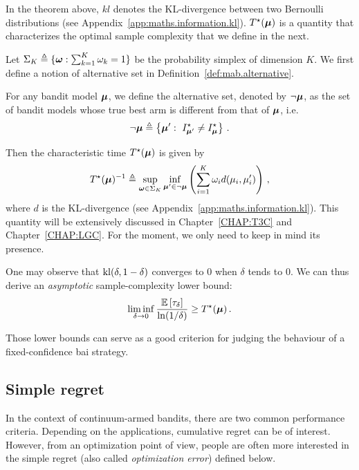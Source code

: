 In the theorem above, $kl$ denotes the KL-divergence between two Bernoulli distributions (see Appendix~\ref{app:maths.information.kl}). $T^\star({\boldsymbol \mu})$ is a quantity that characterizes the optimal sample complexity that we define in the next.

Let $\Sigma_K \triangleq \{{\boldsymbol \omega} : \sum_{k=1}^K \omega_k = 1\}$ be the probability simplex of dimension $K$. We first define a notion of \gls{alternative set} in Definition~\ref{def:mab.alternative}.

\begin{definition}\label{def:mab.alternative}
\begin{leftbar}[defnbar]
For any bandit model ${\boldsymbol \mu}$, we define the alternative set, denoted by $\neg {\boldsymbol \mu}$, as the set of bandit models whose true best arm is different from that of ${\boldsymbol \mu}$, i.e.
\[
    \neg \bmu \eqdef \left\{\bmu':\ \Istar_{\bmu'}\neq\Istar_\bmu\right\}\,.
\]
\end{leftbar}
\end{definition}

Then the characteristic time $T^\star({\boldsymbol \mu})$ is given by
\begin{align}\label{eq:mab.characteristic}
    T^\star({\boldsymbol \mu})^{-1} \triangleq \sup_{{\boldsymbol \omega}\in\Sigma_K}\inf_{{\boldsymbol \mu}'\in\neg{\boldsymbol \mu}}\left(\sum_{i=1}^K \omega_i d(\mu_i,\mu'_i)\right)\,,
\end{align}
where $d$ is the KL-divergence (see Appendix~\ref{app:maths.information.kl}). This quantity will be extensively discussed in Chapter~\ref{CHAP:T3C} and Chapter~\ref{CHAP:LGC}. For the moment, we only need to keep in mind its presence.

One may observe that $\operatorname{\mathrm{kl}}(\delta,1-\delta)$ converges to $0$ when $\delta$ tends to $0$. We can thus derive an \emph{asymptotic} sample-complexity lower bound:
\[
    \liminf_{\delta \rightarrow 0}\frac{\mathbb{E}\left[\tau_\delta\right]}{\ln(1/\delta)} \geq T^\star({\boldsymbol \mu})\,.
\]

Those lower bounds can serve as a good criterion for judging the behaviour of a fixed-confidence \gls{bai} strategy.

\subsection{Simple regret}\label{sec:mab.performance.simple}

In the context of continuum-armed bandits, there are two common performance criteria. Depending on the applications, cumulative regret can be of interest. However, from an optimization point of view, people are often more interested in the \gls{simple regret} (also called \emph{optimization error}) defined below. 

